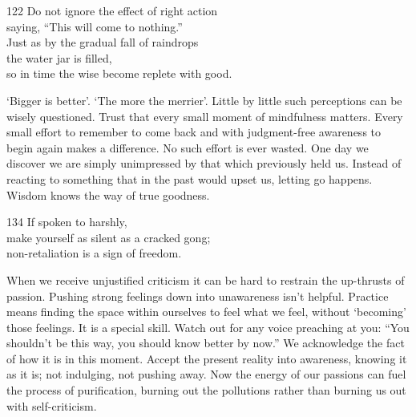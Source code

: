 \begin{dhpVerse}{122}
\label{dhp-122}
Do not ignore the effect of right action\\
saying, ``This will come to nothing.''\\
Just as by the gradual fall of raindrops\\
the water jar is filled,\\
so in time the wise become replete with good.
\end{dhpVerse}

\begin{dhpRefl}

`Bigger is better'. `The more the merrier'. Little by little such
perceptions can be wisely questioned. Trust that every small moment
of mindfulness matters. Every small effort to remember to come back
and with judgment-free awareness to begin again makes a difference.
No such effort is ever wasted. One day we discover we are simply
unimpressed by that which previously held us. Instead of reacting to
something that in the past would upset us, letting go happens. Wisdom
knows the way of true goodness.

\end{dhpRefl}


\begin{dhpVerse}{134}
\label{dhp-134}
If spoken to harshly,\\
make yourself as silent as a cracked gong;\\
non-retaliation is a sign of freedom.
\end{dhpVerse}

\begin{dhpRefl}

When we receive unjustified criticism it can be hard to restrain the
up-thrusts of passion. Pushing strong feelings down into unawareness
isn't helpful. Practice means finding the space within ourselves to
feel what we feel, without `becoming' those feelings. It is a special
skill. Watch out for any voice preaching at you: ``You shouldn't be
this way, you should know better by now.'' We acknowledge the fact of
how it is in this moment. Accept the present reality into awareness,
knowing it as it is; not indulging, not pushing away. Now the energy
of our passions can fuel the process of purification, burning out the
pollutions rather than burning us out with self-criticism.

\end{dhpRefl}

